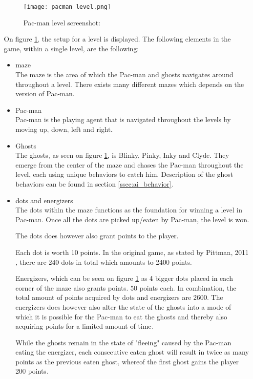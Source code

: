 \begin{figure}[!htbp]
\centering
\texttt{[image: pacman\_level.png]}
\caption{Pac-man level screenshot: \cite{Pittman2011} }
\label{fig:Pac-man}
\end{figure}


On figure \ref{fig:Pac-man}, the setup for a level is displayed. The following elements in the game, within a single level, are the following:

\begin{itemize}
\item maze\\
The maze is the area of which the Pac-man and ghosts navigates around throughout a level. There exists many different mazes which depends on the version of Pac-man.
\item Pac-man\\
Pac-man is the playing agent that is navigated throughout the levels by moving up, down, left and right.
\item Ghosts\\
The ghosts, as seen on figure \ref{fig:Pac-man}, is Blinky, Pinky, Inky and Clyde. They emerge from the center of the maze and chases the Pac-man throughout the level, each using unique behaviors to catch him. Description of the ghost behaviors can be found in section \ref{ssec:ai_behavior}.
\item dots and energizers\\
The dots within the maze functions as the foundation for winning a level in Pac-man. Once all the dots are picked up/eaten by Pac-man, the level is won.

The dots does however also grant points to the player.

Each dot is worth 10 points. In the original game, as stated by Pittman, 2011 \cite{Pittman2011}, there are 240 dots in total which amounts to 2400 points.

Energizers, which can be seen on figure \ref{fig:Pac-man} as 4 bigger dots placed in each corner of the maze also grants points. 50 points each.
In combination, the total amount of points acquired by dots and energizers are  2600. The energizers does however also alter the state of the ghosts into a mode of which it is possible for the Pac-man to eat the ghosts and thereby also acquiring points for a limited amount of time.

While the ghosts remain in the state of "fleeing" caused by the Pac-man eating the energizer, each consecutive eaten ghost will result in twice as many points as the previous eaten ghost, whereof the first ghost gains the player 200 points.


\end{itemize}
